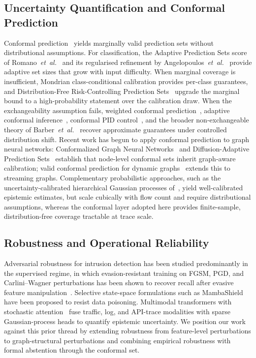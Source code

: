 \documentclass{ieeeaccess}
\begin{document}
\subsection{Uncertainty Quantification and Conformal Prediction}
Conformal prediction~\cite{vovk2022alrw,shafer2008tutorial,angelopoulos2023gentle}
yields marginally valid prediction sets without distributional assumptions.
For classification, the Adaptive Prediction Sets score of
Romano~\emph{et~al.}~\cite{romano2020aps} and its regularised refinement by
Angelopoulos~\emph{et~al.}~\cite{angelopoulos2021raps} provide adaptive set
sizes that grow with input difficulty. When marginal coverage is insufficient,
Mondrian class-conditional calibration provides per-class guarantees, and
Distribution-Free Risk-Controlling Prediction
Sets~\cite{bates2021rcps,angelopoulos2025ltt,angelopoulos2024crc} upgrade
the marginal bound to a high-probability statement over the calibration
draw. When the exchangeability assumption fails, weighted
conformal prediction~\cite{tibshirani2019wcp}, adaptive conformal
inference~\cite{gibbs2021aci}, conformal PID
control~\cite{angelopoulos2024pid}, and the broader non-exchangeable theory
of Barber~\emph{et~al.}~\cite{barber2023nonexch} recover approximate
guarantees under controlled distribution shift. Recent work has begun to
apply conformal prediction to graph neural networks: Conformalized Graph
Neural Networks~\cite{huang2023cfgnn} and Diffusion-Adaptive Prediction
Sets~\cite{zargarbashi2023daps} establish that node-level conformal sets
inherit graph-aware calibration; valid conformal prediction for dynamic
graphs~\cite{davis2025dyncp} extends this to streaming graphs.
Complementary probabilistic approaches, such as the uncertainty-calibrated
hierarchical Gaussian processes of~\cite{anaedevha2026hgp}, yield
well-calibrated epistemic estimates, but scale cubically with flow count
and require distributional assumptions, whereas the conformal layer
adopted here provides finite-sample, distribution-free coverage tractable
at trace scale.

\subsection{Robustness and Operational Reliability}
Adversarial robustness for intrusion detection has been studied
predominantly in the supervised regime, in which evasion-resistant training
on FGSM, PGD, and Carlini--Wagner perturbations has been shown to recover
recall after evasive feature
manipulation~\cite{anaedevha2024robustadv}. Selective state-space
formulations such as MambaShield~\cite{anaedevha2025mambashield} have been
proposed to resist data poisoning. Multimodal transformers with stochastic
attention~\cite{anaedevha2025stochmm} fuse traffic, log, and API-trace
modalities with sparse Gaussian-process heads to quantify epistemic
uncertainty. We position our work against this prior thread by extending
robustness from feature-level perturbations to graph-structural
perturbations and combining empirical robustness with formal abstention
through the conformal set.
\end{document}
